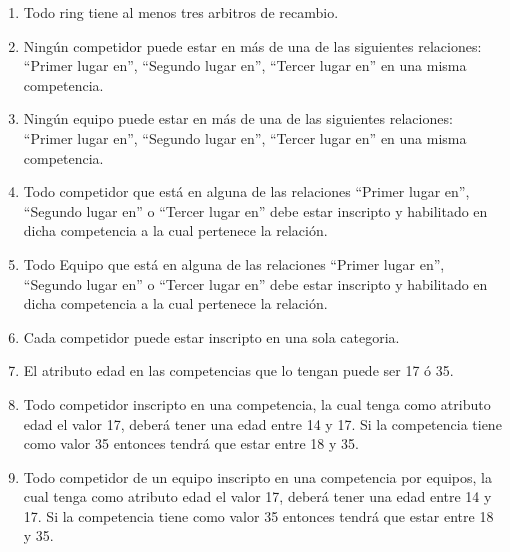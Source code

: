 \begin{enumerate}
    \item Todo ring tiene al menos tres arbitros de recambio.
    \item Ningún competidor puede estar en más de una de las siguientes relaciones: ``Primer lugar en'', ``Segundo lugar en'', ``Tercer lugar en'' en una misma competencia.
    \item Ningún equipo puede estar en más de una de las siguientes relaciones: ``Primer lugar en'', ``Segundo lugar en'', ``Tercer lugar en'' en una misma competencia.
    \item Todo competidor que está en alguna de las relaciones ``Primer lugar en'', ``Segundo lugar en'' o ``Tercer lugar en'' debe estar inscripto y habilitado en dicha competencia a la cual pertenece la relación.
    \item Todo Equipo que está en alguna de las relaciones ``Primer lugar en'', ``Segundo lugar en'' o ``Tercer lugar en'' debe estar inscripto y habilitado en dicha competencia a la cual pertenece la relación.
    \item Cada competidor puede estar inscripto en una sola categoria.
    \item El atributo edad en las competencias que lo tengan puede ser 17 ó 35.
    \item Todo competidor inscripto en una competencia, la cual tenga como atributo edad el valor 17, deberá tener
    una edad entre 14 y 17. Si la competencia tiene como valor 35 entonces tendrá que estar entre
    18 y 35.
    \item Todo competidor de un equipo inscripto en una competencia por equipos, la cual tenga como atributo edad el valor 17, deberá tener
    una edad entre 14 y 17. Si la competencia tiene como valor 35 entonces tendrá que estar entre
    18 y 35.

\end{enumerate}

